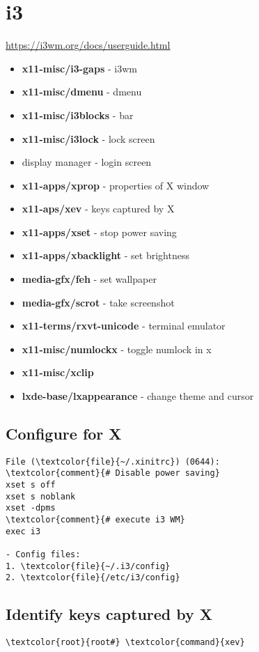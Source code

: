 \documentclass[10pt, a4paper, onecolumn, openany]{book}         %
\begin{document}
\section{i3}
\underline{\url{https://i3wm.org/docs/userguide.html}}\newline
\begin{itemize}
    \item \textbf{x11-misc/i3-gaps}     - i3wm
    \item \textbf{x11-misc/dmenu}       - dmenu
    \item \textbf{x11-misc/i3blocks}    - bar
    \item \textbf{x11-misc/i3lock}      - lock screen
    \item display manager - login screen
    \item \textbf{x11-apps/xprop}       - properties of X window
    \item \textbf{x11-aps/xev}          - keys captured by X
    \item \textbf{x11-apps/xset}        - stop power saving
    \item \textbf{x11-apps/xbacklight}  - set brightness
    \item \textbf{media-gfx/feh}        - set wallpaper
    \item \textbf{media-gfx/scrot}      - take screenshot
    \item \textbf{x11-terms/rxvt-unicode} - terminal emulator
    \item \textbf{x11-misc/numlockx} - toggle numlock in x
    \item \textbf{x11-misc/xclip}
    \item \textbf{lxde-base/lxappearance} - change theme and cursor
\end{itemize}
\subsection{Configure for X}
\begin{Verbatim}[commandchars=\\\{\}]
File (\textcolor{file}{~/.xinitrc}) (0644):
\textcolor{comment}{# Disable power saving}
xset s off
xset s noblank
xset -dpms
\textcolor{comment}{# execute i3 WM}
exec i3

- Config files:
1. \textcolor{file}{~/.i3/config}
2. \textcolor{file}{/etc/i3/config}
\end{Verbatim}

\subsection{Identify keys captured by X}
\begin{Verbatim}[commandchars=\\\{\}]
    \textcolor{root}{root#} \textcolor{command}{xev}
\end{Verbatim}
\end{document}

